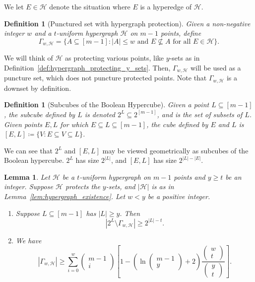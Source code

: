 \documentclass{article}
\newcounter{main}[section]
\newtheorem{definition}[main]{Definition}
\newtheorem{lemma}[main]{Lemma}
\begin{document}
We let $E \in \mathcal{H}$ denote the situation where $E$ is a hyperedge of $\mathcal{H}$.
\begin{definition}[Punctured set with hypergraph protection]
    Given a non-negative integer $w$ and a $t$-uniform hypergraph $\mathcal{H}$ on $m-1$ points, define
    \begin{equation}
        \Gamma_{w, \mathcal{H}} = \{A \subseteq [m-1]: |A| \leq w \text{ and } E \not\subseteq A \text{ for all } E \in \mathcal{H}\}.
    \end{equation}
\end{definition}
We will think of $\mathcal{H}$ as protecting various points, like $y$-sets as in Definition~\ref{def:hypergraph_protecting_y_sets}. Then, $\Gamma_{w,\mathcal{H}}$ will be used as a puncture set, which does not puncture protected points. Note that $\Gamma_{w, \mathcal{H}}$ is a downset by definition.
\begin{definition}[Subcubes of the Boolean Hypercube]
    Given a point $L \subseteq [m-1]$, the subcube defined by $L$ is denoted $2^L \subseteq 2^{[m-1]}$, and is the set of subsets of $L$. Given points $E,L$ for which $E \subseteq L \subseteq [m-1]$, the cube defined by $E$ and $L$ is $[E,L] \coloneq \{V:E \subseteq V \subseteq L\}$.
\end{definition}
We can see that $2^L$ and $[E,L]$ may be viewed geometrically as subcubes of the Boolean hypercube. $2^L$ has size $2^{|L|}$, and $[E,L]$ has size $2^{|L|-|E|}$.
\begin{lemma}\label{lem:protected_puncture_dist_and_dim}
    Let $\mathcal{H}$ be a $t$-uniform hypergraph on $m-1$ points and $y \geq t$ be an integer. Suppose $\mathcal{H}$ protects the $y$-sets, and $|\mathcal{H}|$ is as in Lemma~\ref{lem:hypergraph_existence}. Let $w < y$ be a positive integer.
    \begin{enumerate}
        \item Suppose $L \subseteq [m-1]$ has $|L| \geq y$. Then
        \begin{equation}
            \left|2^L \setminus \Gamma_{w,\mathcal{H}}\right| \geq 2^{|L|-t}.
        \end{equation}
        \item We have
        \begin{equation}
            \left|\Gamma_{w,\mathcal{H}}\right| \geq \sum_{i=0}^{w}\begin{pmatrix}
                m-1\\i
            \end{pmatrix}\left[1-\left(\ln\begin{pmatrix}m-1\\y\end{pmatrix}+2\right)\frac{\begin{pmatrix}w\\t\end{pmatrix}}{\begin{pmatrix}y\\t\end{pmatrix}}\right].
        \end{equation}
    \end{enumerate}
\end{lemma}
\end{document}
